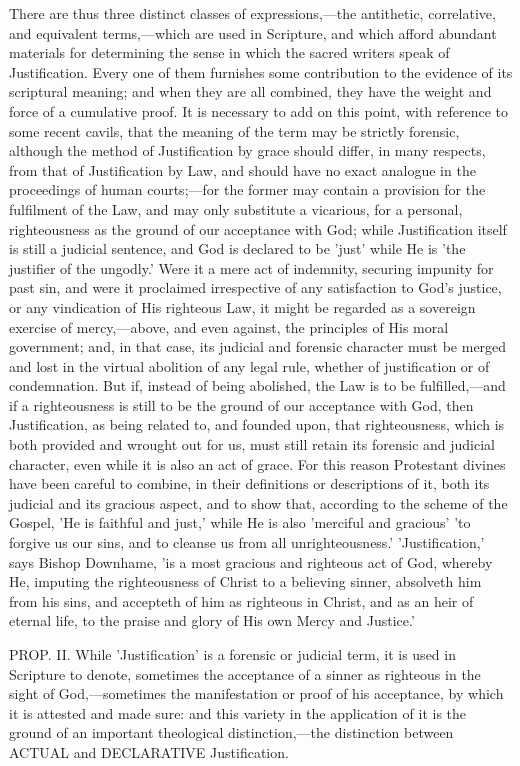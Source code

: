 \documentclass[
]{book}
\begin{document}
There are thus three distinct classes of expressions,---the antithetic, correlative, and equivalent terms,---which are used in Scripture, and which afford abundant materials for determining the sense in which the sacred writers speak of Justification. Every one of them furnishes some contribution to the evidence of its scriptural meaning; and when they are all combined, they have the weight and force of a cumulative proof. It is necessary to add on this point, with reference to some recent cavils, that the meaning of the term may be strictly forensic, although the method of Justification by grace should differ, in many respects, from that of Justification by Law, and should have no exact analogue in the proceedings of human courts;---for the former may contain a provision for the fulfilment of the Law, and may only substitute a vicarious, for a personal, righteousness as the ground of our acceptance with God; while Justification itself is still a judicial sentence, and God is declared to be 'just' while He is 'the justifier of the ungodly.' Were it a mere act of indemnity, securing impunity for past sin, and were it proclaimed irrespective of any satisfaction to God's justice, or any vindication of His righteous Law, it might be regarded as a sovereign exercise of mercy,---above, and even against, the principles of His moral government; and, in that case, its judicial and forensic character must be merged and lost in the virtual abolition of any legal rule, whether of justification or of condemnation. But if, instead of being abolished, the Law is to be fulfilled,---and if a righteousness is still to be the ground of our acceptance with God, then Justification, as being related to, and founded upon, that righteousness, which is both provided and wrought out for us, must still retain its forensic and judicial character, even while it is also an act of grace. For this reason Protestant divines have been careful to combine, in their definitions or descriptions of it, both its judicial and its gracious aspect, and to show that, according to the scheme of the Gospel, 'He is faithful and just,' while He is also 'merciful and gracious' 'to forgive us our sins, and to cleanse us from all unrighteousness.' 'Justification,' says Bishop Downhame, 'is a most gracious and righteous act of God, whereby He, imputing the righteousness of Christ to a believing sinner, absolveth him from his sins, and accepteth of him as righteous in Christ, and as an heir of eternal life, to the praise and glory of His own Mercy and Justice.'

PROP. II. While 'Justification' is a forensic or judicial term, it is used in Scripture to denote, sometimes the acceptance of a sinner as righteous in the sight of God,---sometimes the manifestation or proof of his acceptance, by which it is attested and made sure: and this variety in the application of it is the ground of an important theological distinction,---the distinction between ACTUAL and DECLARATIVE Justification.
\end{document}

